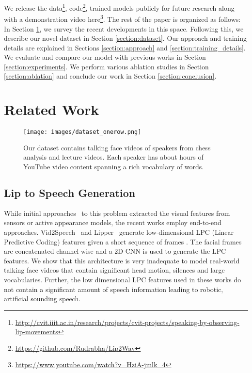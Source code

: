 \documentclass[10pt,twocolumn,letterpaper]{article}
\begin{document}
We release the data\footnote{\url{http://cvit.iiit.ac.in/research/projects/cvit-projects/speaking-by-observing-lip-movements}}, code\footnote{\url{https://github.com/Rudrabha/Lip2Wav}}, trained models publicly for future research along with a demonstration video here\footnote{\url{https://www.youtube.com/watch?v=HziA-jmlk_4}}. The rest of the paper is organized as follows: In Section \ref{section:relatedwork}, we
survey the recent developments in this space. Following this, we describe our novel \modelname dataset in Section \ref{section:dataset}. Our approach and training details are explained in Sections \ref{section:approach} and \ref{section:training_details}. We evaluate and compare our model with previous works in Section \ref{section:experiments}. We perform various ablation studies in Section \ref{section:ablation} and conclude our work in Section \ref{section:conclusion}.

\section{Related Work}
\label{section:relatedwork}

\begin{figure*}[t]
  \texttt{[image: images/dataset\_onerow.png]}  \caption{Our \modelname dataset contains talking face videos of  speakers from chess analysis and lecture videos. Each speaker has about  hours of YouTube video content spanning a rich vocabulary of  words.}
  \label{fig:dataset}
\end{figure*}

\subsection{Lip to Speech Generation}
While initial approaches~\cite{le2017generating,kello2004neural} to this problem extracted the visual features from sensors or active appearance models, the recent works employ end-to-end approaches. Vid2Speech~\cite{ephrat2017vid2speech} and Lipper~\cite{kumar2019lipper} generate low-dimensional LPC (Linear Predictive Coding) features given a short sequence of  frames . The facial frames are concatenated channel-wise and a 2D-CNN is used to generate the LPC features. We show that this architecture is very inadequate to model real-world talking face videos that contain significant head motion, silences and large vocabularies. Further, the low dimensional LPC features used in these works do not contain a significant amount of speech information leading to robotic, artificial sounding speech. 
\end{document}
